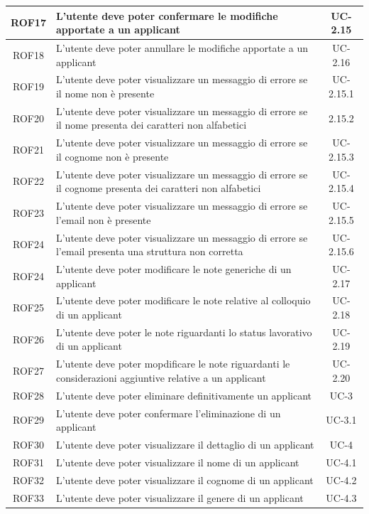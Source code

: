 \begin{center}
\begin{tabularx}{\textwidth}{|c|X|c|}
		\hline
		ROF17 & L'utente deve poter confermare le modifiche apportate a un applicant & UC-2.15 \\
		\hline
		ROF18 & L'utente deve poter annullare le modifiche apportate a un applicant &  UC-2.16\\
		\hline
		ROF19 & L'utente deve poter visualizzare un messaggio di errore se il nome non è presente & UC-2.15.1 \\
		\hline
		ROF20 & L'utente deve poter visualizzare un messaggio di errore se il nome presenta dei caratteri non alfabetici & 2.15.2 \\
		\hline
		ROF21 & L'utente deve poter visualizzare un messaggio di errore se il cognome non è presente & UC-2.15.3 \\
		\hline
		ROF22 & L'utente deve poter visualizzare un messaggio di errore se il cognome presenta dei caratteri non alfabetici & UC-2.15.4\\
		\hline
		ROF23 & L'utente deve poter visualizzare un messaggio di errore se l'email non è presente & UC-2.15.5\\
		\hline
		ROF24 & L'utente deve poter visualizzare un messaggio di errore se l'email presenta una struttura non corretta & UC-2.15.6\\
		\hline
		ROF24 & L'utente deve poter modificare le note generiche di un applicant & UC-2.17 \\
		\hline
		ROF25 & L'utente deve poter modificare le note relative al colloquio di un applicant & UC-2.18 \\
		\hline
		ROF26 & L'utente deve poter le note riguardanti lo status lavorativo di un applicant & UC-2.19\\
		\hline
		ROF27 & L'utente deve poter mopdificare le note riguardanti le considerazioni aggiuntive relative a un applicant &  UC-2.20\\
		\hline
		ROF28 & L'utente deve poter eliminare definitivamente un applicant & UC-3 \\
		\hline
		ROF29 & L'utente deve poter confermare l'eliminazione di un applicant & UC-3.1 \\
		\hline
		ROF30 & L'utente deve poter visualizzare il dettaglio di un applicant & UC-4 \\
		\hline
		ROF31 & L'utente deve poter visualizzare il nome di un applicant & UC-4.1\\
		\hline
		ROF32 & L'utente deve poter visualizzare il cognome di un applicant  & UC-4.2 \\
		\hline
		ROF33 & L'utente deve poter visualizzare il genere di un applicant & UC-4.3\\

\end{tabularx}
\end{center}
